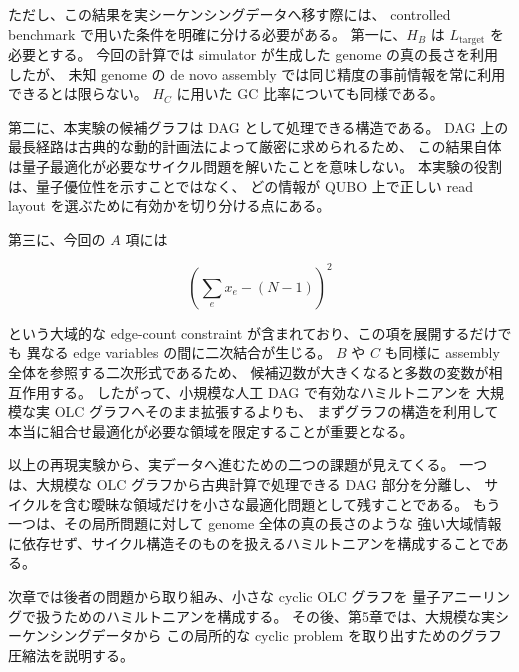 \documentclass[a4j,10pt]{ujarticle}
\begin{document}
ただし、この結果を実シーケンシングデータへ移す際には、
controlled benchmark で用いた条件を明確に分ける必要がある。
第一に、$H_B$ は $L_{\mathrm{target}}$ を必要とする。
今回の計算では simulator が生成した genome の真の長さを利用したが、
未知 genome の de novo assembly では同じ精度の事前情報を常に利用できるとは限らない。
$H_C$ に用いた GC 比率についても同様である。

第二に、本実験の候補グラフは DAG として処理できる構造である。
DAG 上の最長経路は古典的な動的計画法によって厳密に求められるため、
この結果自体は量子最適化が必要なサイクル問題を解いたことを意味しない。
本実験の役割は、量子優位性を示すことではなく、
どの情報が QUBO 上で正しい read layout を選ぶために有効かを切り分ける点にある。

第三に、今回の $A$ 項には

\[
\left(
\sum_e x_e-(N-1)
\right)^2
\]

という大域的な edge-count constraint が含まれており、この項を展開するだけでも
異なる edge variables の間に二次結合が生じる。
$B$ や $C$ も同様に assembly 全体を参照する二次形式であるため、
候補辺数が大きくなると多数の変数が相互作用する。
したがって、小規模な人工 DAG で有効なハミルトニアンを
大規模な実 OLC グラフへそのまま拡張するよりも、
まずグラフの構造を利用して本当に組合せ最適化が必要な領域を限定することが重要となる。

以上の再現実験から、実データへ進むための二つの課題が見えてくる。
一つは、大規模な OLC グラフから古典計算で処理できる DAG 部分を分離し、
サイクルを含む曖昧な領域だけを小さな最適化問題として残すことである。
もう一つは、その局所問題に対して genome 全体の真の長さのような
強い大域情報に依存せず、サイクル構造そのものを扱えるハミルトニアンを構成することである。

次章では後者の問題から取り組み、小さな cyclic OLC グラフを
量子アニーリングで扱うためのハミルトニアンを構成する。
その後、第5章では、大規模な実シーケンシングデータから
この局所的な cyclic problem を取り出すためのグラフ圧縮法を説明する。






















\end{document}
